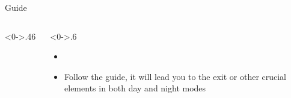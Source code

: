 \documentclass[notheorems]{beamer}
\begin{document}
\begin{framenl}{Guide}
\begin{columns}[T] %
	\begin{column}<0->{.46\textwidth}
		\begin{figure}[thpb]
			\centering
		\end{figure}
	\end{column}%
\hfill%
	\begin{column}<0->{.6\textwidth}
		\begin{itemize}
			\item []
			\item<1-> Follow the guide, it will lead you to the exit or other crucial elements in both day and night modes
		\end{itemize}
	\end{column}%
\end{columns}
\end{framenl}
\end{document}
